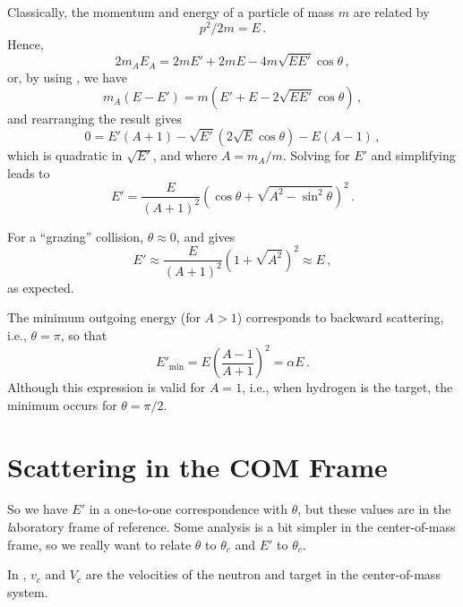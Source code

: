 Classically, the momentum and energy of a particle of 
mass $m$ are related by
\begin{equation}
  p^2 /2m = E \, .
\end{equation}
Hence,
\begin{equation}
 2 m_A E_A = 2 m E' + 2 m E - 4m \sqrt{E E'} \cos \theta \, ,
\end{equation}
or, by using , we have 
\begin{equation}
 m_A (E-E') = m (E' + E - 2 \sqrt{EE'}\cos \theta) \, ,
\end{equation}
and rearranging the result gives
\begin{equation}
  0 = E'(A+1) - \sqrt{E'} (2 \sqrt{E} \cos \theta ) - E (A-1) \, ,
\end{equation}
which is quadratic in $\sqrt{E'}$, and where $A=m_A/m$.  
Solving for $E'$ and 
simplifying leads to
\begin{equation}
 E' = \frac{E}{(A+1)^2} (\cos \theta + \sqrt{A^2 - \sin^2 \theta})^2 \, .
\label{eq:scattered_neutron_energy_lab}
\end{equation}

For a ``grazing'' collision, $\theta \approx 0$, 
and  gives
\begin{equation}
  E' \approx \frac{E}{(A+1)^2} (1 + \sqrt{A^2})^2 \approx E \, ,
\end{equation}
as expected.  

The minimum outgoing energy (for $A > 1$) corresponds to backward scattering,
i.e., $\theta = \pi$, so that
\begin{equation}
  E'_{\text{min}} = E \left ( \frac{A-1}{A+1} \right )^2 = \alpha E \, .
\end{equation}
Although this expression is valid for $A = 1$, i.e., when hydrogen is 
the target, the minimum occurs for $\theta = \pi/2$.

\section*{Scattering in the COM Frame}

So we have $E'$ in a one-to-one correspondence with $\theta$, but these 
values are in the {\emph laboratory} frame of reference.  Some 
analysis is a bit simpler in the center-of-mass frame, so we really
want to relate $\theta$ to $\theta_c$ and $E'$ to $\theta_c$.

In , $v_c$ and $V_c$ are the 
velocities of the neutron and target in the center-of-mass system.

